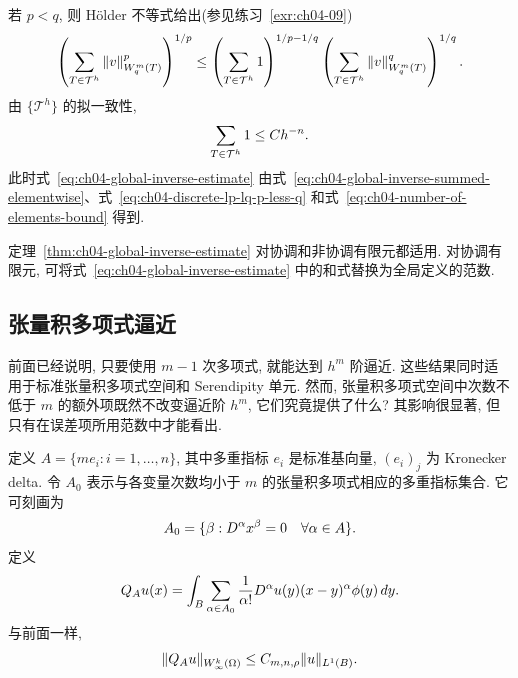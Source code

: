\begin{Proof}
若 $p<q$, 则 Hölder 不等式给出(参见练习~\ref{exr:ch04-09})
\begin{equation}
\MathBookFormulaID{formula-ch04-discrete-lp-lq-p-less-q}
\label{eq:ch04-discrete-lp-lq-p-less-q}
\left(\sum_{T\in\mathcal T^h}\|v\|_{W_q^m(T)}^p\right)^{1/p}
\leq\left(\sum_{T\in\mathcal T^h}1\right)^{1/p-1/q}
\left(\sum_{T\in\mathcal T^h}\|v\|_{W_q^m(T)}^q\right)^{1/q}.
\end{equation}
由 $\{\mathcal T^h\}$ 的拟一致性,
\begin{equation}
\MathBookFormulaID{formula-ch04-number-of-elements-bound}
\label{eq:ch04-number-of-elements-bound}
\sum_{T\in\mathcal T^h}1\leq Ch^{-n}.
\end{equation}
此时式~\eqref{eq:ch04-global-inverse-estimate} 由式~\eqref{eq:ch04-global-inverse-summed-elementwise}、式~\eqref{eq:ch04-discrete-lp-lq-p-less-q} 和式~\eqref{eq:ch04-number-of-elements-bound} 得到.
\end{Proof}

\setcounter{thmcount}{19}
\begin{Remark}
\label{rem:ch04-inverse-estimate-conforming-nonconforming}
定理~\ref{thm:ch04-global-inverse-estimate} 对协调和非协调有限元都适用. 对协调有限元, 可将式~\eqref{eq:ch04-global-inverse-estimate} 中的和式替换为全局定义的范数.
\end{Remark}

\subsection{张量积多项式逼近}
\label{sec:ch04-tensor-product-polynomial-approximation}
\setcounter{thmcount}{0}
\setcounter{equation}{0}

前面已经说明, 只要使用 $m-1$ 次多项式, 就能达到 $h^m$ 阶逼近. 这些结果同时适用于标准张量积多项式空间和 Serendipity 单元. 然而, 张量积多项式空间中次数不低于 $m$ 的额外项既然不改变逼近阶 $h^m$, 它们究竟提供了什么? 其影响很显著, 但只有在误差项所用范数中才能看出.

定义 $A=\{me_i:i=1,\ldots,n\}$, 其中多重指标 $e_i$ 是标准基向量, $(e_i)_j$ 为 Kronecker delta. 令 $A_0$ 表示与各变量次数均小于 $m$ 的张量积多项式相应的多重指标集合. 它可刻画为
\begin{equation}
\MathBookFormulaID{formula-ch04-tensor-product-index-set}
\label{eq:ch04-tensor-product-index-set}
A_0=\{\beta:D^\alpha x^\beta=0\quad\forall\alpha\in A\}.
\end{equation}
定义
\begin{equation}
\MathBookFormulaID{formula-ch04-tensor-product-averaged-polynomial}
\label{eq:ch04-tensor-product-averaged-polynomial}
Q_Au(x)=\int_B\sum_{\alpha\in A_0}\frac1{\alpha!}
D^\alpha u(y)(x-y)^\alpha\phi(y)\,dy.
\end{equation}
与前面一样,
\begin{equation}
\MathBookFormulaID{formula-ch04-tensor-product-averaged-polynomial-bound}
\label{eq:ch04-tensor-product-averaged-polynomial-bound}
\|Q_Au\|_{W_\infty^k(\Omega)}
\leq C_{m,n,\rho}\|u\|_{L^1(B)}.
\end{equation}

